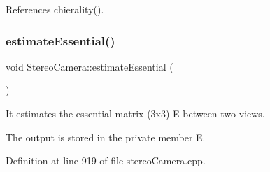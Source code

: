 References chierality().

\mbox{\label{classStereoCamera_ab2eded08bca185ac22cd6343cb4c85c8}} 
\subsubsection{\texorpdfstring{estimateEssential()}{estimateEssential()}}
{\footnotesize\ttfamily void Stereo\+Camera\+::estimate\+Essential (\begin{DoxyParamCaption}{ }\end{DoxyParamCaption})}



It estimates the essential matrix (3x3) E between two views. 

The output is stored in the private member E. 

Definition at line 919 of file stereo\+Camera.\+cpp.


